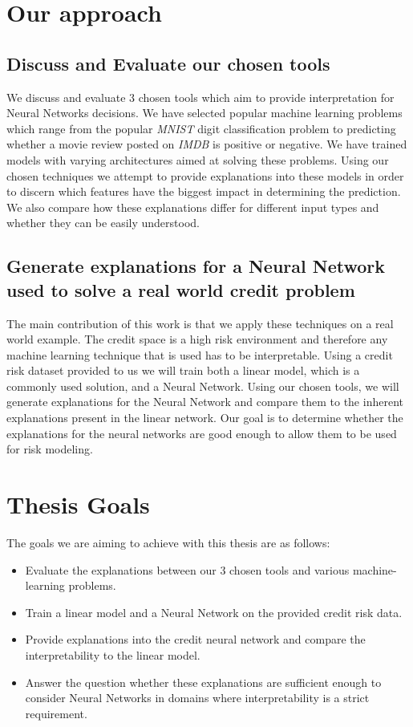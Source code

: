 \section{Our approach}
\subsection{Discuss and Evaluate our chosen tools}
We discuss and evaluate 3 chosen tools which aim to provide interpretation for Neural Networks decisions. We have selected popular machine learning problems which range from the popular \emph{MNIST} digit classification problem to predicting whether a movie review posted on \emph{IMDB} is positive or negative. We have trained models with varying architectures aimed at solving these problems. Using our chosen techniques we attempt to provide explanations into these models in order to discern which features have the biggest impact in determining the prediction. We also compare how these explanations differ for different input types and whether they can be easily understood.

\subsection{Generate explanations for a Neural Network used to solve a real world credit problem}
The main contribution of this work is that we apply these techniques on a real world example. The credit space is a high risk environment and therefore any machine learning technique that is used has to be interpretable. Using a credit risk dataset provided to us we will train both a linear model, which is a commonly used solution, and a Neural Network. Using our chosen tools, we will generate explanations for the Neural Network and compare them to the inherent explanations present in the linear network. Our goal is to determine whether the explanations for the neural networks are good enough to allow them to be used for risk modeling.

\section{Thesis Goals}
The goals we are aiming to achieve with this thesis are as follows:
\begin{itemize}
    \item Evaluate the explanations between our 3 chosen tools and various machine-learning problems.
    \item Train a linear model and a Neural Network on the provided credit risk data.
    \item Provide explanations into the credit neural network and compare the interpretability to the linear model.
    \item Answer the question whether these explanations are sufficient enough to consider Neural Networks in domains where interpretability is a strict requirement.
\end{itemize}
